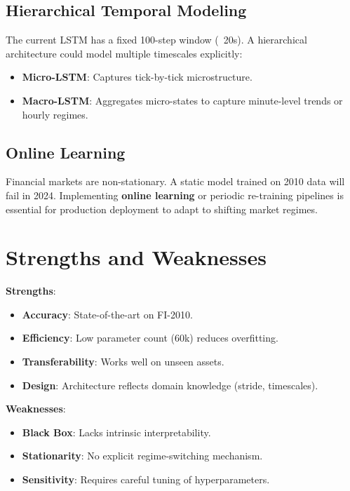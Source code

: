 \documentclass[10pt]{article}
\begin{document}
\subsection{Hierarchical Temporal Modeling}
The current LSTM has a fixed 100-step window (~20s). A hierarchical architecture could model multiple timescales explicitly:
\begin{itemize}
    \item \textbf{Micro-LSTM}: Captures tick-by-tick microstructure.
    \item \textbf{Macro-LSTM}: Aggregates micro-states to capture minute-level trends or hourly regimes.
\end{itemize}

\subsection{Online Learning}
Financial markets are non-stationary. A static model trained on 2010 data will fail in 2024. 
Implementing \textbf{online learning} or periodic re-training pipelines is essential for production deployment to adapt to shifting market regimes.

\section{Strengths and Weaknesses}

\textbf{Strengths}:
\begin{itemize}
    \item \textbf{Accuracy}: State-of-the-art on FI-2010.
    \item \textbf{Efficiency}: Low parameter count (60k) reduces overfitting.
    \item \textbf{Transferability}: Works well on unseen assets.
    \item \textbf{Design}: Architecture reflects domain knowledge (stride, timescales).
\end{itemize}

\textbf{Weaknesses}:
\begin{itemize}
    \item \textbf{Black Box}: Lacks intrinsic interpretability.
    \item \textbf{Stationarity}: No explicit regime-switching mechanism.
    \item \textbf{Sensitivity}: Requires careful tuning of hyperparameters.
\end{itemize}
\end{document}
